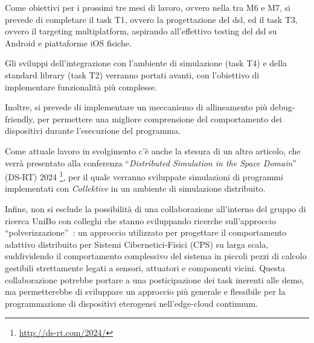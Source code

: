 \documentclass[13pt, a4paper]{article}
\newcommand{\ck}{\emph{Collektive}}
\begin{document}

Come obiettivi per i prossimi tre mesi di lavoro, ovvero nella  tra M6 e M7,
    si prevede di completare il task T1, ovvero la progettazione del \ac{dsl},
    ed il task T3, ovvero il targeting multiplatform,
    aspirando all'effettivo testing del \ac{dsl} su Android e piattaforme iOS fisiche.

Gli sviluppi dell'integrazione con l'ambiente di simulazione (task T4) e della standard library (task T2) verranno portati
    avanti, con l'obiettivo di implementare funzionalità più complesse.

Inoltre, si prevede di implementare un meccanismo di allineamento più debug-friendly,
    per permettere una migliore comprensione del comportamento dei dispositivi durante l'esecuzione del programma.

Come attuale lavoro in svolgimento c'è anche la stesura di un altro articolo, che verrà presentato alla conferenza
    ``\emph{Distributed Simulation in the Space Domain}'' (DS-RT) 2024
    \footnote{\url{http://ds-rt.com/2024/}},
    per il quale verranno sviluppate simulazioni di programmi implementati con \ck{} in un ambiente di simulazione distribuito.

Infine, non si esclude la possibilità di una collaborazione all'interno del gruppo di ricerca UniBo con colleghi che stanno sviluppando
    ricerche sull'approccio ``polverizzazione''~\cite{fi12110203}:
    un approccio utilizzato per progettare il comportamento adattivo distribuito per Sistemi Cibernetici-Fisici (CPS) su larga scala,
    suddividendo il comportamento complessivo del sistema in piccoli pezzi di calcolo gestibili strettamente legati a sensori, attuatori e componenti vicini.
%
Questa collaborazione potrebbe portare a una posticipazione dei task inerenti alle demo, ma permetterebbe di sviluppare
    un approccio più generale e flessibile per la programmazione di dispositivi eterogenei nell'edge-cloud continuum.





\end{document}
